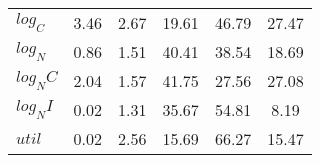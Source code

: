 \begin{center}
\begin{longtable}{lccccc}
$log_C         $	 & 	        3.46	 & 	        2.67	 & 	       19.61	 & 	       46.79	 & 	       27.47 \\ 
$log_N         $	 & 	        0.86	 & 	        1.51	 & 	       40.41	 & 	       38.54	 & 	       18.69 \\ 
$log_NC        $	 & 	        2.04	 & 	        1.57	 & 	       41.75	 & 	       27.56	 & 	       27.08 \\ 
$log_NI        $	 & 	        0.02	 & 	        1.31	 & 	       35.67	 & 	       54.81	 & 	        8.19 \\ 
$util          $	 & 	        0.02	 & 	        2.56	 & 	       15.69	 & 	       66.27	 & 	       15.47 \\ 
\end{longtable}
 \end{center}
